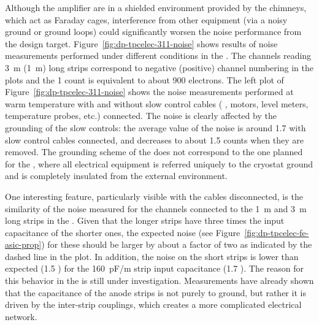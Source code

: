 Although the  amplifier  are in a shielded environment provided by the chimneys, which act as Faraday cages,
interference from other equipment (via a noisy ground or ground loops) could significantly worsen the noise performance from the design target. Figure~\ref{fig:dp-tpcelec-311-noise} shows %
results of %
noise measurements performed under different conditions in the . The channels reading \SI{3}{\meter} (\SI{1}{\metre}) long strips correspond to negative (positive) channel numbering in the plots and the \num{1}  count is equivalent to about \num{900} electrons. The left plot of Figure~\ref{fig:dp-tpcelec-311-noise} shows the noise measurements performed at warm temperature with and without slow control cables ( ,  motors, level meters, temperature probes, etc.) connected. 
The noise is clearly affected by the grounding of the slow controls: the average value of the noise \rms is around \num{1.7}  with slow control cables connected, and decreases to about \num{1.5}  counts when they are removed. %
The grounding scheme of the  does not correspond to the one %
planned for the , where all electrical equipment is referred uniquely to the cryostat ground and is completely insulated from the external environment. 

One interesting feature, particularly visible with the cables disconnected, is %
the similarity of the noise measured for the channels connected to the \SI{1}{\meter} and \SI{3}{\meter} long strips in the . 
Given that the longer strips have %
three times the input capacitance of the shorter ones, the expected noise (see Figure~\ref{fig:dp-tpcelec-fe-asic-prop}) for these should be larger by about a factor of two as indicated by the dashed line in the plot. In addition, the noise on the short strips is lower than expected (\num{1.5} ) for the \SI{160}{pF/m} strip input capacitance (\num{1.7} ). The reason for this behavior %
in the  is still under investigation. %
Measurements have already shown that the capacitance of the  anode strips is not purely to ground, but rather it is driven by the inter-strip couplings, which creates a more complicated electrical network. 

